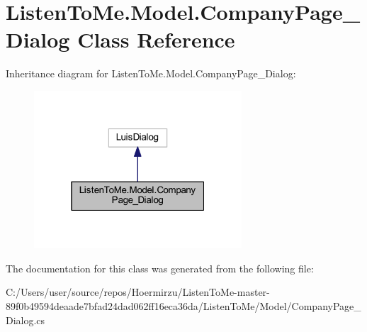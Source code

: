 \hypertarget{class_listen_to_me_1_1_model_1_1_company_page___dialog}{}\section{Listen\+To\+Me.\+Model.\+Company\+Page\+\_\+\+Dialog Class Reference}
\label{class_listen_to_me_1_1_model_1_1_company_page___dialog}


Inheritance diagram for Listen\+To\+Me.\+Model.\+Company\+Page\+\_\+\+Dialog\+:\nopagebreak
\begin{figure}[H]
\begin{center}
\leavevmode
\includegraphics[width=220pt]{class_listen_to_me_1_1_model_1_1_company_page___dialog__inherit__graph}
\end{center}
\end{figure}


The documentation for this class was generated from the following file\+:\begin{DoxyCompactItemize}
\item 
C\+:/\+Users/user/source/repos/\+Hoermirzu/\+Listen\+To\+Me-\/master-\/89f0b49594deaade7bfad24dad062ff16eca36da/\+Listen\+To\+Me/\+Model/Company\+Page\+\_\+\+Dialog.\+cs\end{DoxyCompactItemize}
